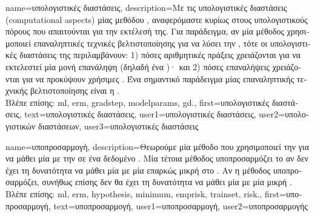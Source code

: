 {name={\foreignlanguage{greek}{υπολογιστικές διαστάσεις}}, 
	description={\foreignlanguage{greek}{Με τις υπολογιστικές διαστάσεις} (computational aspects) 
		\foreignlanguage{greek}{μίας μεθόδου} , \foreignlanguage{greek}{αναφερόμαστε κυρίως στους υπολογιστικούς πόρους  
		που απαιτούνται για την εκτέλεσή της. Για παράδειγμα, αν μία μέθοδος}  \foreignlanguage{greek}{χρησιμοποιεί  
		επαναληπτικές τεχνικές βελτιστοποίησης για να λύσει την} , \foreignlanguage{greek}{τότε οι υπολογιστικές διαστάσεις 
		της περιλαμβάνουν: 1) πόσες αριθμητικές πράξεις χρειάζονται για να εκτελεστεί μία μονή επανάληψη (δηλαδή ένα} )·  
		\foreignlanguage{greek}{και 2) πόσες επαναλήψεις χρειάζονται για να προκύψουν χρήσιμες} . 
		\foreignlanguage{greek}{Ένα σημαντικό παράδειγμα μίας επαναληπτικής τεχνικής βελτιστοποίησης είναι η} .\\
		\foreignlanguage{greek}{Βλέπε επίσης:} \gls{ml}, \gls{erm}, \gls{gradstep}, \gls{modelparams}, \gls{gd}.}, 
	first={\foreignlanguage{greek}{υπολογιστικές διαστάσεις}},
	text={\foreignlanguage{greek}{υπολογιστικές διαστάσεις}},
	user1={\foreignlanguage{greek}{υπολογιστικές διαστάσεις}}, %
	user2={\foreignlanguage{greek}{υπολογιστικών διαστάσεων}}, %
	user3={\foreignlanguage{greek}{υπολογιστικές διαστάσεις}} %
}

{name={\foreignlanguage{greek}{υποπροσαρμογή}},
	description={\foreignlanguage{greek}{Θεωρούμε μία μέθοδο} 
		 \foreignlanguage{greek}{που χρησιμοποιεί την}  \foreignlanguage{greek}{για να 
		μάθει μία}  \foreignlanguage{greek}{με την}   
		\foreignlanguage{greek}{σε ένα δεδομένο} . \foreignlanguage{greek}{Μία τέτοια μέθοδος 
		υποπροσαρμόζει το}  \foreignlanguage{greek}{αν δεν έχει τη δυνατότητα να μάθει μία} 
		 \foreignlanguage{greek}{με μία επαρκώς μικρή}  \foreignlanguage{greek}{στο} 
		. \foreignlanguage{greek}{Αν η μέθοδος υποπροσαρμόζει, συνήθως επίσης δεν θα έχει τη 
		δυνατότητα να μάθει μία}  \foreignlanguage{greek}{με μία μικρή} .\\
		\foreignlanguage{greek}{Βλέπε επίσης:} \gls{ml}, \gls{erm}, \gls{hypothesis}, \gls{minimum}, \gls{emprisk}, \gls{trainset}, \gls{risk}.},
	first={\foreignlanguage{greek}{υποπροσαρμογή}},
	text={\foreignlanguage{greek}{υποπροσαρμογή}},
	user1={\foreignlanguage{greek}{υποπροσαρμογή}}, %
    	user2={\foreignlanguage{greek}{υποπροσαρμογής}} %
}

